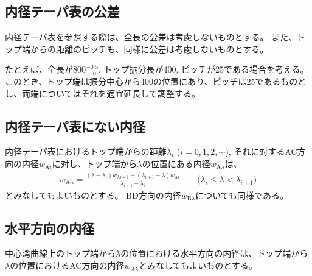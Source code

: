 \subsection{内径テーパ表の公差}
内径テーパ表を参照する際は、全長の公差は考慮しないものとする。
また、トップ端からの距離のピッチも、同様に公差は考慮しないものとする。
\begin{hosoku}
たとえば、全長が$800^{+0.5}_{\phantom -0}$, トップ振分長が400, ピッチが25である場合を考える。
このとき、トップ端は振分中心から400の位置にあり、ピッチは25であるものとし、両端についてはそれを適宜延長して調整する。
\end{hosoku}

\subsection{内径テーパ表にない内径}
内径テーパ表におけるトップ端からの距離$\lambda_i$ ($i = 0, 1, 2, \cdots$), それに対するAC方向の内径$w_{\mathrm Ai}$に対し、トップ端から$\lambda$の位置にある内径$w_{\mathrm A\lambda}$は、
\begin{align*}
  w_{\mathrm A\lambda}
  = \frac{(\lambda-\lambda_i)w_{\mathrm Ai+1}+(\lambda_{i+1}-\lambda)w_{\mathrm Ai}}{\lambda_{i+1}-\lambda_i}
  \qquad
  \Big(\lambda_i \leq \lambda < \lambda_{i+1}\Big)
\end{align*}
とみなしてもよいものとする。
BD方向の内径$w_{\mathrm B\lambda}$についても同様である。

\subsection{水平方向の内径}
中心湾曲線上のトップ端から$\lambda$の位置における水平方向の内径は、トップ端から$\lambda$の位置におけるAC方向の内径$w_{A\lambda}$とみなしてもよいものとする。

